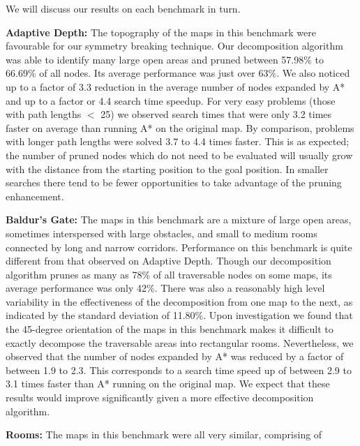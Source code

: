 We will discuss our results on each benchmark in turn.

\textbf{Adaptive Depth:} 
The topography of the maps in this benchmark were favourable for
our symmetry breaking technique.  Our decomposition algorithm was
able to identify many large open areas and pruned between 57.98\%
to 66.69\% of all nodes.  Its average performance was just over
63\%.  We also noticed up to a factor of 3.3 reduction in the average number
of nodes expanded by A* and up to a factor or 4.4 search time
speedup.  For very easy problems (those with path lengths $<$ 25)
we observed search times that were only 3.2 times faster on average
than running A* on the original map.  By comparison, problems with
longer path lengths were solved 3.7 to 4.4 times faster.  This is
as expected; the number of pruned nodes which do not need to be
evaluated will usually grow with the distance from the starting
position to the goal position. In smaller searches there tend to
be fewer opportunities to take advantage of the pruning enhancement.
%
\par
\textbf{Baldur's Gate: }
The maps in this benchmark are a mixture of large open areas,
sometimes interspersed with large obstacles, and small to medium
rooms connected by long and narrow corridors.  Performance on this
benchmark is quite different from that observed on Adaptive Depth.
Though our decomposition algorithm prunes as many as 78\% of all
traversable nodes on some maps, its average performance was only
42\%.  There was also a reasonably high level variability in the
effectiveness of the decomposition from one map to the next, as
indicated by the standard deviation of 11.80\%.  Upon investigation
we found that the 45-degree orientation of the maps in this benchmark
makes it difficult to exactly decompose the traversable areas into
 rectangular rooms.
Nevertheless, we observed that the number of nodes expanded by A*
was reduced by a factor of between 1.9 to 2.3.  This corresponds
to a search time speed up of between 2.9 to 3.1 times faster than
A* running on the original map.  We expect that these results would
improve significantly given a more effective decomposition algorithm.
\par 
\textbf{Rooms:} 
The maps in this benchmark were all very similar, comprising of
